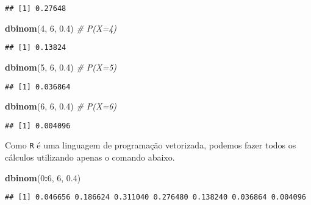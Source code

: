 \documentclass[]{book}
\newenvironment{Shaded}{\begin{snugshade}}{\end{snugshade}}
\newcommand{\CommentTok}[1]{\textcolor[rgb]{0.56,0.35,0.01}{\textit{#1}}}
\newcommand{\DecValTok}[1]{\textcolor[rgb]{0.00,0.00,0.81}{#1}}
\newcommand{\FloatTok}[1]{\textcolor[rgb]{0.00,0.00,0.81}{#1}}
\newcommand{\KeywordTok}[1]{\textcolor[rgb]{0.13,0.29,0.53}{\textbf{#1}}}
\newcommand{\NormalTok}[1]{#1}
\newcommand{\OperatorTok}[1]{\textcolor[rgb]{0.81,0.36,0.00}{\textbf{#1}}}
\theoremstyle{definition}
\theoremstyle{definition}
\theoremstyle{definition}
\theoremstyle{remark}
\begin{document}
\begin{verbatim}
## [1] 0.27648
\end{verbatim}

\begin{Shaded}
\begin{Highlighting}[]
\KeywordTok{dbinom}\NormalTok{(}\DecValTok{4}\NormalTok{, }\DecValTok{6}\NormalTok{, }\FloatTok{0.4}\NormalTok{) }\CommentTok{# P(X=4)}
\end{Highlighting}
\end{Shaded}

\begin{verbatim}
## [1] 0.13824
\end{verbatim}

\begin{Shaded}
\begin{Highlighting}[]
\KeywordTok{dbinom}\NormalTok{(}\DecValTok{5}\NormalTok{, }\DecValTok{6}\NormalTok{, }\FloatTok{0.4}\NormalTok{) }\CommentTok{# P(X=5)}
\end{Highlighting}
\end{Shaded}

\begin{verbatim}
## [1] 0.036864
\end{verbatim}

\begin{Shaded}
\begin{Highlighting}[]
\KeywordTok{dbinom}\NormalTok{(}\DecValTok{6}\NormalTok{, }\DecValTok{6}\NormalTok{, }\FloatTok{0.4}\NormalTok{) }\CommentTok{# P(X=6)}
\end{Highlighting}
\end{Shaded}

\begin{verbatim}
## [1] 0.004096
\end{verbatim}

Como \texttt{R} é uma linguagem de programação vetorizada, podemos fazer todos os cálculos utilizando apenas o comando abaixo.

\begin{Shaded}
\begin{Highlighting}[]
\KeywordTok{dbinom}\NormalTok{(}\DecValTok{0}\OperatorTok{:}\DecValTok{6}\NormalTok{, }\DecValTok{6}\NormalTok{, }\FloatTok{0.4}\NormalTok{)}
\end{Highlighting}
\end{Shaded}

\begin{verbatim}
## [1] 0.046656 0.186624 0.311040 0.276480 0.138240 0.036864 0.004096
\end{verbatim}
\end{document}
